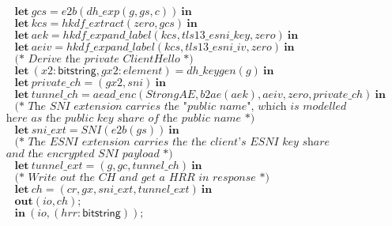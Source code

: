 \documentclass{article}
\theoremstyle{definition}
\newcommand{\kwl}[1]{\mathbf{#1}}
\newcommand{\kwt}[1]{\mathsf{#1}}
\newcommand{\var}[1]{\mathit{#1}}
\theoremstyle{definition}
\begin{document}
\begin{tabbing}
$\ \ \ \ \ \kwl{let}\ \var{gcs} = \var{e2b}(\var{dh{\_}exp}(\var{g}, \var{gs}, \var{c}))\ \kwl{in} $\\
$\ \ \ \ \ \kwl{let}\ \var{kcs} = \var{hkdf{\_}extract}(\var{zero}, \var{gcs})\ \kwl{in} $\\
$\ \ \ \ \ \kwl{let}\ \var{aek} = \var{hkdf{\_}expand{\_}label}(\var{kcs}, \var{tls13{\_}esni{\_}key}, \var{zero})\ \kwl{in} $\\
$\ \ \ \ \ \kwl{let}\ \var{aeiv} = \var{hkdf{\_}expand{\_}label}(\var{kcs}, \var{tls13{\_}esni{\_}iv}, \var{zero})\ \kwl{in} $\\
$ $\\
$\ \ \ \ \ \textit{(* Derive the private ClientHello *)} $\\
$\ \ \ \ \ \kwl{let}\ (\var{x2}{:}\kwt{bitstring}, \var{gx2}{:}\var{element}) = \var{dh{\_}keygen}(\var{g})\ \kwl{in} $\\
$\ \ \ \ \ \kwl{let}\ \var{private{\_}ch} = (\var{gx2}, \var{sni})\ \kwl{in} $\\
$\ \ \ \ \ \kwl{let}\ \var{tunnel{\_}ch} = \var{aead{\_}enc}(\var{StrongAE}, \var{b2ae}(\var{aek}), \var{aeiv}, \var{zero}, \var{private{\_}ch})\ \kwl{in} $\\
$ $\\
$\ \ \ \ \ \textit{(* The SNI extension carries the "public name", which is modelled }$\\
$\textit{        here as the public key share of the public name *)} $\\
$\ \ \ \ \ \kwl{let}\ \var{sni{\_}ext} = \var{SNI}(\var{e2b}(\var{gs}))\ \kwl{in} $\\
$ $\\
$\ \ \ \ \ \textit{(* The ESNI extension carries the the client's ESNI key share}$\\
$\textit{        and the encrypted SNI payload *)} $\\
$\ \ \ \ \ \kwl{let}\ \var{tunnel{\_}ext} = (\var{g}, \var{gc}, \var{tunnel{\_}ch})\ \kwl{in} $\\
$ $\\
$\ \ \ \ \ \textit{(* Write out the CH and get a HRR in response *)} $\\
$\ \ \ \ \ \kwl{let}\ \var{ch} = (\var{cr}, \var{gx}, \var{sni{\_}ext}, \var{tunnel{\_}ext})\ \kwl{in} $\\
$\ \ \ \ \ \kwl{out}(\var{io}, \var{ch}); $\\
$ $\\
$\ \ \ \ \ \kwl{in}\ (\var{io}, (\var{hrr}{:}\kwt{bitstring})); $\\

\end{tabbing}
\end{document}
